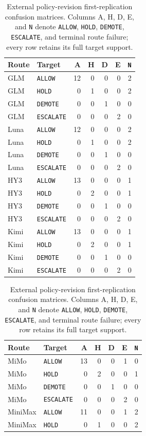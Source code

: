 \documentclass[10pt]{article}
\newcommand{\allow}{\texttt{ALLOW}}
\newcommand{\hold}{\texttt{HOLD}}
\newcommand{\demote}{\texttt{DEMOTE}}
\newcommand{\escalate}{\texttt{ESCALATE}}
\begin{document}
\begin{table}[htbp]
\centering
\footnotesize
\setlength{\tabcolsep}{2.3pt}
\caption{External policy-revision first-replication confusion matrices. Columns A, H, D, E, and
\texttt{N} denote \allow{}, \hold{}, \demote{}, \escalate{}, and terminal route failure;
every row retains its full target support.}
\label{tab:external-confusion}
\begin{minipage}[t]{0.49\textwidth}
\centering
\begin{tabular}{@{}llrrrrr@{}}
\toprule
Route & Target & A & H & D & E & \texttt{N} \\
\midrule
GLM & \allow{} & 12&0&0&0&2 \\
GLM & \hold{} & 0&1&0&0&2 \\
GLM & \demote{} & 0&0&1&0&0 \\
GLM & \escalate{} & 0&0&0&2&0 \\
\midrule
Luna & \allow{} & 12&0&0&0&2 \\
Luna & \hold{} & 0&1&0&0&2 \\
Luna & \demote{} & 0&0&1&0&0 \\
Luna & \escalate{} & 0&0&0&2&0 \\
\midrule
HY3 & \allow{} & 13&0&0&0&1 \\
HY3 & \hold{} & 0&2&0&0&1 \\
HY3 & \demote{} & 0&0&1&0&0 \\
HY3 & \escalate{} & 0&0&0&2&0 \\
\midrule
Kimi & \allow{} & 13&0&0&0&1 \\
Kimi & \hold{} & 0&2&0&0&1 \\
Kimi & \demote{} & 0&0&1&0&0 \\
Kimi & \escalate{} & 0&0&0&2&0 \\
\bottomrule
\end{tabular}
\end{minipage}\hfill
\begin{minipage}[t]{0.49\textwidth}
\centering
\begin{tabular}{@{}llrrrrr@{}}
\toprule
Route & Target & A & H & D & E & \texttt{N} \\
\midrule
MiMo & \allow{} & 13&0&0&1&0 \\
MiMo & \hold{} & 0&2&0&0&1 \\
MiMo & \demote{} & 0&0&1&0&0 \\
MiMo & \escalate{} & 0&0&0&2&0 \\
\midrule
MiniMax & \allow{} & 11&0&0&1&2 \\
MiniMax & \hold{} & 0&1&0&0&2 \\

\end{tabular}
\end{minipage}
\end{table}
\end{document}
